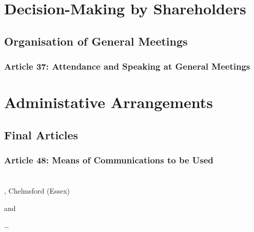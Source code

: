 \documentclass[letterpaper,10pt,openany,oneside,english]{sphinxmanual}
\begin{document}
\chapter{Decision-Making by Shareholders}
\label{\detokenize{decisionmaking:decision-making-by-shareholders}}\label{\detokenize{decisionmaking::doc}}

\section{Organisation of General Meetings}
\label{\detokenize{decisionmaking:organisation-of-general-meetings}}

\subsection{Article 37: Attendance and Speaking at General Meetings}
\label{\detokenize{decisionmaking:article-37-attendance-and-speaking-at-general-meetings}}

\chapter{Administative Arrangements}
\label{\detokenize{administrativearrangements:administative-arrangements}}\label{\detokenize{administrativearrangements::doc}}

\section{Final Articles}
\label{\detokenize{administrativearrangements:final-articles}}

\subsection{Article 48: Means of Communications to be Used}
\label{\detokenize{administrativearrangements:article-48-means-of-communications-to-be-used}}

\chapter{}
\label{\detokenize{index:document-author-s}}
, Chelmsford (Essex)

and

 …
\end{document}
